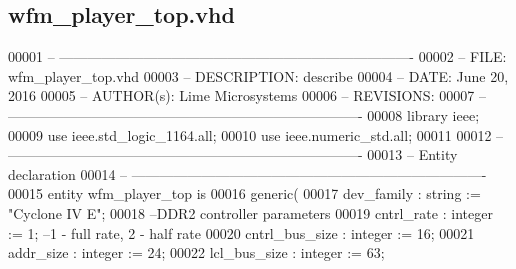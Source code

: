 \subsection{wfm\+\_\+player\+\_\+top.\+vhd}
\label{wfm__player__top_8vhd_source}

\begin{DoxyCode}
00001 \textcolor{keyword}{-- ---------------------------------------------------------------------------- }
00002 \textcolor{keyword}{-- FILE:    wfm\_player\_top.vhd}
00003 \textcolor{keyword}{-- DESCRIPTION: describe}
00004 \textcolor{keyword}{-- DATE:    June 20, 2016}
00005 \textcolor{keyword}{-- AUTHOR(s):   Lime Microsystems}
00006 \textcolor{keyword}{-- REVISIONS:}
00007 \textcolor{keyword}{-- ---------------------------------------------------------------------------- }
00008 \textcolor{vhdlkeyword}{library }\textcolor{keywordflow}{ieee};
00009 \textcolor{vhdlkeyword}{use }ieee.std\_logic\_1164.\textcolor{keywordflow}{all};
00010 \textcolor{vhdlkeyword}{use }ieee.numeric\_std.\textcolor{keywordflow}{all};
00011 
00012 \textcolor{keyword}{-- ----------------------------------------------------------------------------}
00013 \textcolor{keyword}{-- Entity declaration}
00014 \textcolor{keyword}{-- ----------------------------------------------------------------------------}
00015 \textcolor{keywordflow}{entity }wfm_player_top \textcolor{keywordflow}{is}
00016     \textcolor{keywordflow}{generic}\textcolor{vhdlchar}{(}
00017             \textcolor{vhdlchar}{dev_family}          \textcolor{vhdlchar}{:} \textcolor{comment}{string}  \textcolor{vhdlchar}{:=} \textcolor{keyword}{"Cyclone IV E"}; 
00018 \textcolor{keyword}{            --DDR2 controller parameters}
00019             \textcolor{vhdlchar}{cntrl_rate}          \textcolor{vhdlchar}{:} \textcolor{comment}{integer} \textcolor{vhdlchar}{:=} \textcolor{vhdllogic}{}\textcolor{vhdllogic}{1};\textcolor{keyword}{ --1 - full rate, 2 - half rate}
00020             \textcolor{vhdlchar}{cntrl_bus_size}      \textcolor{vhdlchar}{:} \textcolor{comment}{integer} \textcolor{vhdlchar}{:=} \textcolor{vhdllogic}{}\textcolor{vhdllogic}{16};
00021             \textcolor{vhdlchar}{addr_size}           \textcolor{vhdlchar}{:} \textcolor{comment}{integer} \textcolor{vhdlchar}{:=} \textcolor{vhdllogic}{}\textcolor{vhdllogic}{24};
00022             \textcolor{vhdlchar}{lcl_bus_size}        \textcolor{vhdlchar}{:} \textcolor{comment}{integer} \textcolor{vhdlchar}{:=} \textcolor{vhdllogic}{}\textcolor{vhdllogic}{63};

\end{DoxyCode}
